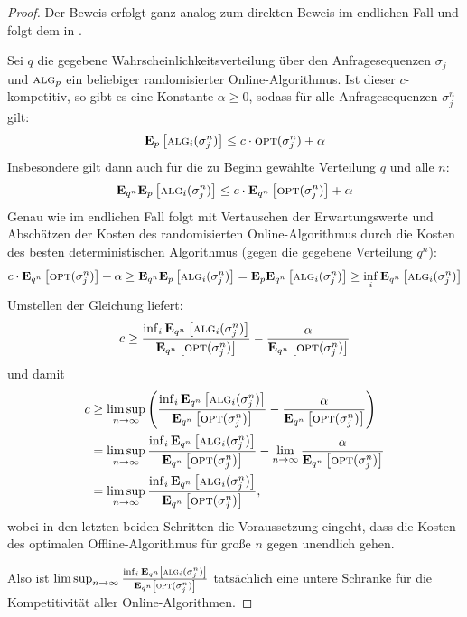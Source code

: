 \documentclass[a4paper,ngerman,12pt,bibtotoc]{scrartcl}
\theoremstyle{definition}
\theoremstyle{plain}
\theoremstyle{remark}
\renewcommand{\_}{\mathpunct{.}\,}
\newcommand{\?}{\,{:}\,}
\newcommand{\Alg}{\ensuremath{\textsc{alg}}}
\newcommand{\Opt}{\ensuremath{\textsc{opt}}}
\newcommand{\EE}{\mathbf{E}}
\newcommand{\sjn}{\sigma_j^n}
\begin{document}
	\begin{proof}
		Der Beweis erfolgt ganz analog zum direkten Beweis im endlichen Fall und folgt dem in \cite[Lemma 7.2]{borodin}.
		
		Sei $q$ die gegebene Wahrscheinlichkeitsverteilung über den Anfragesequenzen $\sigma_j$ und $\Alg_p$ ein beliebiger randomisierter Online-Algorithmus. Ist dieser $c$-kompetitiv, so gibt es eine Konstante $\alpha \geq 0$, sodass für alle Anfragesequenzen $\sigma_j^n$ gilt:
			\[\EE_p\left[\Alg_i(\sjn)\right] \leq c\cdot \Opt(\sjn)+\alpha\]
		Insbesondere gilt dann auch für die zu Beginn gewählte Verteilung $q$ und alle $n$:
			\[\EE_{q^n}\EE_p\left[\Alg_i(\sjn)\right] \leq c\cdot \EE_{q^n}\left[\Opt(\sjn)\right]+\alpha\]
		Genau wie im endlichen Fall folgt mit Vertauschen der Erwartungswerte und Abschätzen der Kosten des randomisierten Online-Algorithmus durch die Kosten des besten deterministischen Algorithmus (gegen die gegebene Verteilung $q^n$):
			\[c\cdot \EE_{q^n}\left[\Opt(\sjn)\right]+\alpha \geq \EE_{q^n}\EE_p\left[\Alg_i(\sjn)\right] = \EE_p\EE_{q^n}\left[\Alg_i(\sjn)\right] \geq \inf_i\EE_{q^n}\left[\Alg_i(\sjn)\right]\]
		Umstellen der Gleichung liefert:
			\[c \geq \frac{\inf_i\EE_{q^n}\left[\Alg_i(\sjn)\right]}{\EE_{q^n}\left[\Opt(\sjn)\right]} - \frac{\alpha}{\EE_{q^n}\left[\Opt(\sjn)\right]} \]
		und damit
		\begin{align*}
			c 	&\geq \limsup_{n\to\infty}\left(\frac{\inf_i\EE_{q^n}\left[\Alg_i(\sjn)\right]}{\EE_{q^n}\left[\Opt(\sjn)\right]} - \frac{\alpha}{\EE_{q^n}\left[\Opt(\sjn)\right]}\right) \\
				&= \limsup_{n\to\infty}\frac{\inf_i\EE_{q^n}\left[\Alg_i(\sjn)\right]}{\EE_{q^n}\left[\Opt(\sjn)\right]} - \lim_{n\to\infty}\frac{\alpha}{\EE_{q^n}\left[\Opt(\sjn)\right]} \\
				&=\limsup_{n\to\infty}\frac{\inf_i\EE_{q^n}\left[\Alg_i(\sjn)\right]}{\EE_{q^n}\left[\Opt(\sjn)\right]},
		\end{align*}
		wobei in den letzten beiden Schritten die Voraussetzung eingeht, dass die Kosten des optimalen Offline-Algorithmus für große $n$ gegen unendlich gehen.
		
		Also ist $\limsup_{n\to\infty}\frac{\inf_i\EE_{q^n}\left[\Alg_i(\sjn)\right]}{\EE_{q^n}\left[\Opt(\sjn)\right]}$ tatsächlich eine untere Schranke für die Kompetitivität aller Online-Algorithmen.
	\end{proof}
	
\end{document}
